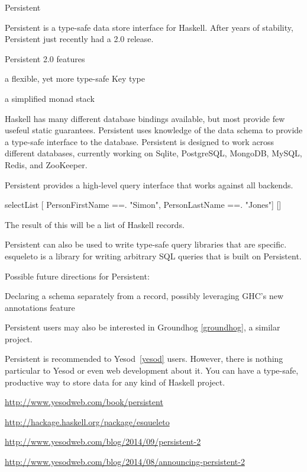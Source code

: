 \begin{hcarentry}{Persistent}
\label{persistent}
\makeheader

Persistent is a type-safe data store interface for Haskell.
After years of stability, Persistent just recently had a 2.0 release.

Persistent 2.0 features

\begin{compactitem}
\item a flexible, yet more type-safe Key type
\item a simplified monad stack
\end{compactitem}

Haskell has many different database bindings available, but most provide few
usefeul static guarantees.  Persistent uses knowledge of the data schema to
provide a type-safe interface to the database.  Persistent is designed to work
across different databases, currently working on Sqlite, PostgreSQL, MongoDB,
MySQL, Redis, and ZooKeeper.

Persistent provides a high-level query interface that works against all
backends.

\begin{code}
selectList [ PersonFirstName ==. "Simon",
             PersonLastName ==. "Jones"] []
\end{code}

The result of this will be a list of Haskell records.

Persistent can also be used to write type-safe query libraries that are
specific.  esqueleto is a library for writing arbitrary SQL queries that is
built on Persistent.

\FuturePlans
Possible future directions for Persistent:
\begin{compactitem}
\item Declaring a schema separately from a record, possibly leveraging GHC's
  new annotations feature
\end{compactitem}

Persistent users may also be interested in Groundhog \cref{groundhog}, a
similar project.

Persistent is recommended to Yesod~\cref{yesod} users.  However, there is
nothing particular to Yesod or even web development about it.  You can have a
type-safe, productive way to store data for any kind of Haskell project.

\FurtherReading
\begin{compactitem}
\item \url{http://www.yesodweb.com/book/persistent} 
\item \url{http://hackage.haskell.org/package/esqueleto}
\item \url{http://www.yesodweb.com/blog/2014/09/persistent-2}
\item \url{http://www.yesodweb.com/blog/2014/08/announcing-persistent-2}
\end{compactitem}
\end{hcarentry}

